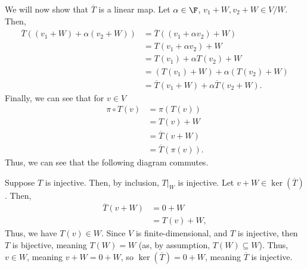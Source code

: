 \documentclass[12pt]{mypackage}
\begin{document}
\begin{solution}
  We will now show that $\overline{T}$ is a linear map. Let $\alpha \in \F$, $v_1 + W,v_2 + W\in V/W$. Then,
  \begin{align*}
    \overline{T}\left(\left(v_1 + W\right) + \alpha \left(v_2 + W\right)\right) &= \overline{T}\left(\left(v_1 + \alpha v_2\right) + W\right)\\
                                                                                &= T\left(v_1 + \alpha v_2\right) + W\\
                                                                                &= T\left(v_1\right) + \alpha T\left(v_2\right) + W\\
                                                                                &= \left(T\left(v_1\right) + W\right) + \alpha\left(T\left(v_2\right) + W\right)\\
                                                                                &= \overline{T}\left(v_1 + W\right) + \alpha \overline{T}\left(v_2 + W\right).
  \end{align*}
  Finally, we can see that for $v\in V$
  \begin{align*}
    \pi \circ T\left(v\right) &= \pi\left(T(v)\right)\\
                              &= T\left(v\right) + W\\
                              &= \overline{T}\left(v + W\right)\\
                              &= \overline{T}\left(\pi\left(v\right)\right).
  \end{align*}
  Thus, we can see that the following diagram commutes.
  \begin{center}
  \end{center}
  Suppose $T$ is injective. Then, by inclusion, $T\bigr\vert_{W}$ is injective. Let $v + W\in \ker\left(\overline{T}\right)$. Then,
  \begin{align*}
    \overline{T}\left(v + W\right) &= 0 + W\\
                                   &= T\left(v\right) + W,
  \end{align*}
  Thus, we have $T(v) \in W$. Since $V$ is finite-dimensional, and $T$ is injective, then $T$ is bijective, meaning $T(W) = W$ (as, by assumption, $T(W)\subseteq W$). Thus, $v\in W$, meaning $v + W = 0 + W$, so $\ker\left(\overline{T}\right) = 0 + W$, meaning $\overline{T}$ is injective.\newline


\end{solution}
\end{document}
